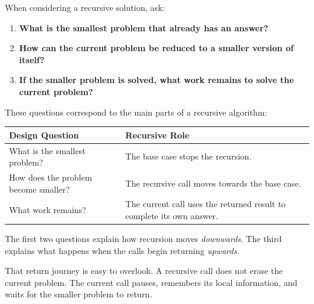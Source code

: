 \documentclass{csc2059practical}
\begin{document}
When considering a recursive solution, ask:

\begin{enumerate}
    \item \textbf{What is the smallest problem that already has an answer?}
    \item \textbf{How can the current problem be reduced to a smaller version
          of itself?}
    \item \textbf{If the smaller problem is solved, what work remains to solve
          the current problem?}
\end{enumerate}

These questions correspond to the main parts of a recursive algorithm:

\begin{center}
\begin{tabular}{p{} p{}}
\toprule
\textbf{Design Question} & \textbf{Recursive Role} \\
\midrule
What is the smallest problem? & The base case stops the recursion. \\
How does the problem become smaller? & The recursive call moves towards
the base case. \\
What work remains? & The current call uses the returned result to complete its
own answer. \\
\bottomrule
\end{tabular}
\end{center}

The first two questions explain how recursion moves \emph{downwards}. The third
explains what happens when the calls begin returning \emph{upwards}.

That return journey is easy to overlook. A recursive call does not erase the
current problem. The current call pauses, remembers its local information, and
waits for the smaller problem to return.
\end{document}
